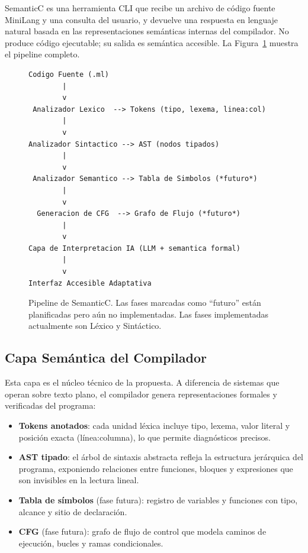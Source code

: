 \documentclass[conference]{IEEEtran}
\begin{document}
SemanticC es una herramienta CLI que recibe un archivo de código fuente MiniLang y una consulta del usuario, y devuelve una respuesta en lenguaje natural basada en las representaciones semánticas internas del compilador. No produce código ejecutable; su salida es semántica accesible. La Figura~\ref{fig:arquitectura} muestra el pipeline completo.

\begin{figure}[h]
\centering
\begin{lstlisting}[language={},frame=single,numbers=none,basicstyle=\ttfamily\scriptsize]
Codigo Fuente (.ml)
        |
        v
 Analizador Lexico  --> Tokens (tipo, lexema, linea:col)
        |
        v
Analizador Sintactico --> AST (nodos tipados)
        |
        v
 Analizador Semantico --> Tabla de Simbolos (*futuro*)
        |
        v
  Generacion de CFG  --> Grafo de Flujo (*futuro*)
        |
        v
Capa de Interpretacion IA (LLM + semantica formal)
        |
        v
Interfaz Accesible Adaptativa
\end{lstlisting}
\caption{Pipeline de SemanticC. Las fases marcadas como ``futuro'' están planificadas pero aún no implementadas. Las fases implementadas actualmente son Léxico y Sintáctico.}
\label{fig:arquitectura}
\end{figure}

\subsection{Capa Semántica del Compilador}

Esta capa es el núcleo técnico de la propuesta. A diferencia de sistemas que operan sobre texto plano, el compilador genera representaciones formales y verificadas del programa:

\begin{itemize}
    \item \textbf{Tokens anotados}: cada unidad léxica incluye tipo, lexema, valor literal y posición exacta (línea:columna), lo que permite diagnósticos precisos.
    \item \textbf{AST tipado}: el árbol de sintaxis abstracta refleja la estructura jerárquica del programa, exponiendo relaciones entre funciones, bloques y expresiones que son invisibles en la lectura lineal.
    \item \textbf{Tabla de símbolos} (fase futura): registro de variables y funciones con tipo, alcance y sitio de declaración.
    \item \textbf{CFG} (fase futura): grafo de flujo de control que modela caminos de ejecución, bucles y ramas condicionales.
\end{itemize}
\end{document}
